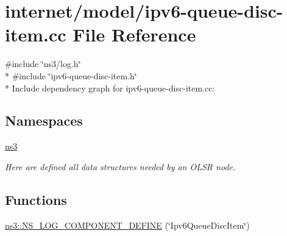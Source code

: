 \hypertarget{ipv6-queue-disc-item_8cc}{}\section{internet/model/ipv6-\/queue-\/disc-\/item.cc File Reference}
\label{ipv6-queue-disc-item_8cc}
{\ttfamily \#include \char`\"{}ns3/log.\+h\char`\"{}}\\*
{\ttfamily \#include \char`\"{}ipv6-\/queue-\/disc-\/item.\+h\char`\"{}}\\*
Include dependency graph for ipv6-\/queue-\/disc-\/item.cc\+:
\subsection*{Namespaces}
\begin{DoxyCompactItemize}
\item 
 \hyperlink{namespacens3}{ns3}
\begin{DoxyCompactList}\small\item\em Here are defined all data structures needed by an O\+L\+SR node. \end{DoxyCompactList}\end{DoxyCompactItemize}
\subsection*{Functions}
\begin{DoxyCompactItemize}
\item 
\hyperlink{namespacens3_a05e0628e3e37f2ca40f3a45d49b18adc}{ns3\+::\+N\+S\+\_\+\+L\+O\+G\+\_\+\+C\+O\+M\+P\+O\+N\+E\+N\+T\+\_\+\+D\+E\+F\+I\+NE} (\char`\"{}Ipv6\+Queue\+Disc\+Item\char`\"{})
\end{DoxyCompactItemize}
